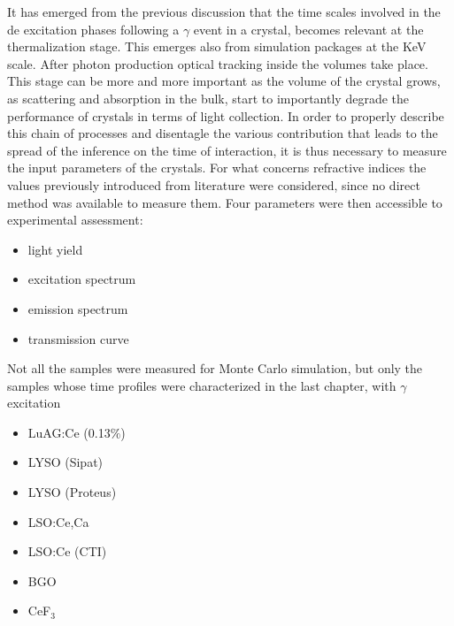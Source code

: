 It has emerged from the previous discussion that the time scales involved in the de excitation phases following a $\gamma$ event in a crystal, becomes relevant at the thermalization stage. This emerges also from simulation packages at the KeV scale.
After photon production optical tracking inside the volumes take place. This stage can be more and more important as the volume of the crystal grows, as scattering and absorption in the bulk, start to importantly degrade the performance of crystals in terms of light collection.
In order to properly describe this chain of processes and disentagle the various contribution that leads to the spread of the inference on the time of interaction, it is thus necessary to measure the input parameters of the crystals.
For what concerns refractive indices the values previously introduced from literature were considered, since no direct method was available to measure them.
Four parameters were then accessible to experimental assessment:
\begin{itemize}
\item light yield
\item excitation spectrum
\item emission spectrum
\item transmission curve
\end{itemize}
Not all the samples were measured for Monte Carlo simulation, but only the samples whose time profiles  were characterized in the last chapter, with $\gamma$ excitation 
\begin{itemize}
\item LuAG:Ce (0.13$\%$)
\item LYSO (Sipat)
\item LYSO (Proteus)
\item LSO:Ce,Ca 
\item LSO:Ce (CTI)
\item BGO
\item CeF$_{3}$
\end{itemize}
